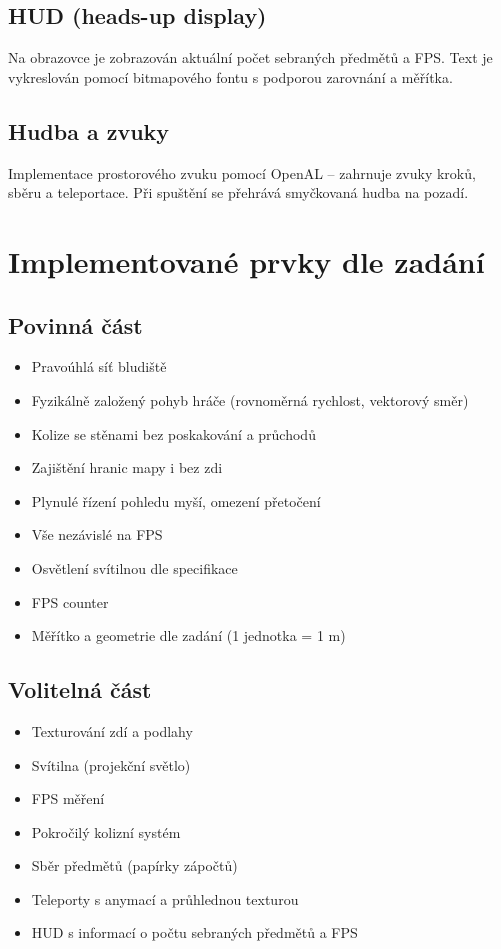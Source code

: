 \documentclass[12pt,a4paper]{article}
\begin{document}
\subsection*{HUD (heads-up display)}
Na obrazovce je zobrazován aktuální počet sebraných předmětů a FPS. Text je vykreslován pomocí bitmapového fontu s podporou zarovnání a měřítka.

\subsection*{Hudba a zvuky}
Implementace prostorového zvuku pomocí OpenAL – zahrnuje zvuky kroků, sběru a teleportace. Při spuštění se přehrává smyčkovaná hudba na pozadí.

\section{Implementované prvky dle zadání}

\subsection*{Povinná část}
\begin{itemize}
    \item Pravoúhlá síť bludiště
    \item Fyzikálně založený pohyb hráče (rovnoměrná rychlost, vektorový směr)
    \item Kolize se stěnami bez poskakování a průchodů
    \item Zajištění hranic mapy i bez zdi
    \item Plynulé řízení pohledu myší, omezení přetočení
    \item Vše nezávislé na FPS
    \item Osvětlení svítilnou dle specifikace
    \item FPS counter
    \item Měřítko a geometrie dle zadání (1 jednotka = 1 m)
\end{itemize}

\subsection*{Volitelná část}
\begin{itemize}
    \item Texturování zdí a podlahy
    \item Svítilna (projekční světlo)
    \item FPS měření
    \item Pokročilý kolizní systém
    \item Sběr předmětů (papírky zápočtů)
    \item Teleporty s anymací a průhlednou texturou
    \item HUD s informací o počtu sebraných předmětů a FPS
\end{itemize}
\end{document}
